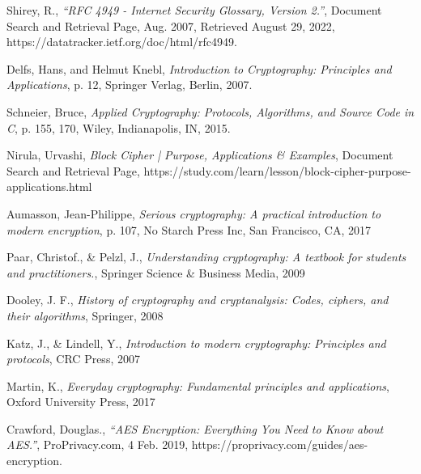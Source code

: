 \backmatter

\clearpage %
{}

\renewcommand{\bibname}{References}

\begin{thebibliography}{11}

  Shirey, R.,
  \emph{“RFC 4949 - Internet Security Glossary, Version 2.”},
  Document Search and Retrieval Page,
  Aug. 2007,
  Retrieved August 29, 2022, 
  https://datatracker.ietf.org/doc/html/rfc4949. 

  Delfs, Hans, and Helmut Knebl,
  \emph{Introduction to Cryptography: Principles and Applications},
  p. 12, Springer Verlag, Berlin,
  2007.
  
  Schneier, Bruce,
  \emph{Applied Cryptography: Protocols, Algorithms, and Source Code in C},
  p. 155, 170, Wiley, Indianapolis, IN,
  2015.

  Nirula, Urvashi,
  \emph{Block Cipher | Purpose, Applications \& Examples},
  Document Search and Retrieval Page,
  https://study.com/learn/lesson/block-cipher-purpose-applications.html
  
  Aumasson, Jean-Philippe,
  \emph{Serious cryptography: A practical introduction to modern encryption},
  p. 107, No Starch Press Inc, San Francisco, CA, 
  2017
  
  Paar, Christof., \& Pelzl, J.,
 \emph{Understanding cryptography: A textbook for students and practitioners.},
  Springer Science \& Business Media,
  2009
  
  Dooley, J. F.,
  \emph{History of cryptography and cryptanalysis: Codes, ciphers, and their algorithms},
   Springer,
   2008
  
  Katz, J., \& Lindell, Y.,
  \emph{Introduction to modern cryptography: Principles and protocols},
  CRC Press,
  2007
  
  Martin, K.,
  \emph{Everyday cryptography: Fundamental principles and applications},
  Oxford University Press,
  2017
  
  Crawford, Douglas.,
  \emph{“AES Encryption: Everything You Need to Know about AES.”},
   ProPrivacy.com, 
   4 Feb. 2019, 
   https://proprivacy.com/guides/aes-encryption. 


\end{thebibliography}
